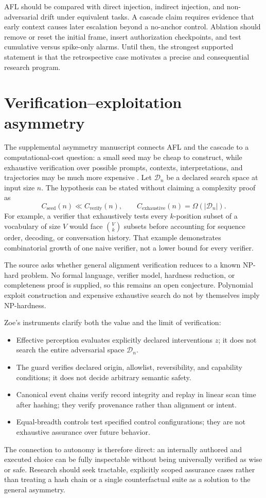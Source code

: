 AFL should be compared with direct injection, indirect injection, and non-adversarial drift under equivalent tasks. A cascade claim requires evidence that early context causes later escalation beyond a no-anchor control. Ablation should remove or reset the initial frame, insert authorization checkpoints, and test cumulative versus spike-only alarms. Until then, the strongest supported statement is that the retrospective case motivates a precise and consequential research program.

\section{Verification--exploitation asymmetry}
The supplemental asymmetry manuscript connects AFL and the cascade to a computational-cost question: a small seed may be cheap to construct, while exhaustive verification over possible prompts, contexts, interpretations, and trajectories may be much more expensive \cite{kloster2026asymmetry}. Let $\mathcal D_n$ be a declared search space at input size $n$. The hypothesis can be stated without claiming a complexity proof as
\begin{equation}
C_{\mathrm{seed}}(n)\ll C_{\mathrm{verify}}(n),
\qquad
C_{\mathrm{exhaustive}}(n)=\Omega(|\mathcal D_n|).
\end{equation}
For example, a verifier that exhaustively tests every $k$-position subset of a vocabulary of size $V$ would face $\binom{V}{k}$ subsets before accounting for sequence order, decoding, or conversation history. That example demonstrates combinatorial growth of one naive verifier, not a lower bound for every verifier.

The source asks whether general alignment verification reduces to a known NP-hard problem. No formal language, verifier model, hardness reduction, or completeness proof is supplied, so this remains an open conjecture. Polynomial exploit construction and expensive exhaustive search do not by themselves imply NP-hardness.

Zoe's instruments clarify both the value and the limit of verification:
\begin{itemize}
  \item Effective perception evaluates explicitly declared interventions $z$; it does not search the entire adversarial space $\mathcal D_n$.
  \item The guard verifies declared origin, allowlist, reversibility, and capability conditions; it does not decide arbitrary semantic safety.
  \item Canonical event chains verify record integrity and replay in linear scan time after hashing; they verify provenance rather than alignment or intent.
  \item Equal-breadth controls test specified control configurations; they are not exhaustive assurance over future behavior.
\end{itemize}
The connection to autonomy is therefore direct: an internally authored and executed choice can be fully inspectable without being universally verified as wise or safe. Research should seek tractable, explicitly scoped assurance cases rather than treating a hash chain or a single counterfactual suite as a solution to the general asymmetry.

